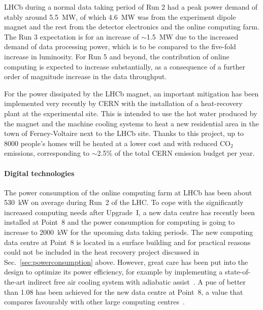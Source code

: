 \documentclass[../SustainableHEP.tex]{subfiles}
\begin{document}
\begin{casestudy}
LHCb during a normal data taking period of Run 2 had a peak power demand of stably around 5.5~MW, of which 4.6~MW was from the experiment dipole magnet and the rest from the detector electronics and the online computing farm.  The Run 3 expectation is for an increase of $\sim$1.5~MW due to the increased demand of data processing power, which is to be compared to the five-fold increase in luminosity.
For Run 5 and beyond, the contribution of online computing is expected to increase substantially, as a consequence of a further order of magnitude increase in the data throughput.

For the power dissipated by the LHCb magnet, an important mitigation has been implemented very recently by CERN with the installation of a heat-recovery plant at the experimental site. This is intended to use the
hot water produced by the magnet and the machine cooling systems to heat a new residential area in the
town of Ferney-Voltaire next to the LHCb site. Thanks to this project, up to 8000 people’s homes will be heated at a lower cost and with reduced CO$_2$ emissions, corresponding to $\sim$2.5\% of the total CERN emission budget per year. 

\paragraph{Digital technologies}

The power consumption of the online computing farm at LHCb has been about 530~kW on average during Run~2 of the LHC. To cope with the significantly increased computing needs after Upgrade~I, a new data centre has recently been installed at Point~8 and the power consumption for computing is going to increase to 2000~kW for the upcoming data taking periods. 
The new computing data centre at Point~8 is located in a surface building and for practical reasons could not be included in the heat recovery project discussed in Sec.~\ref{sec:powerconsumption} above. However, great care has been put into the design to optimize its power efficiency, for example by implementing a state-of-the-art indirect free air cooling system with adiabatic assist~\cite{lbldcreport}.
A \acrshort{pue} of better than 1.08 has been achieved for the new data centre at Point~8, a value that compares favourably with other large computing centres~\cite{pue-data}. 


\end{casestudy}
\end{document}
